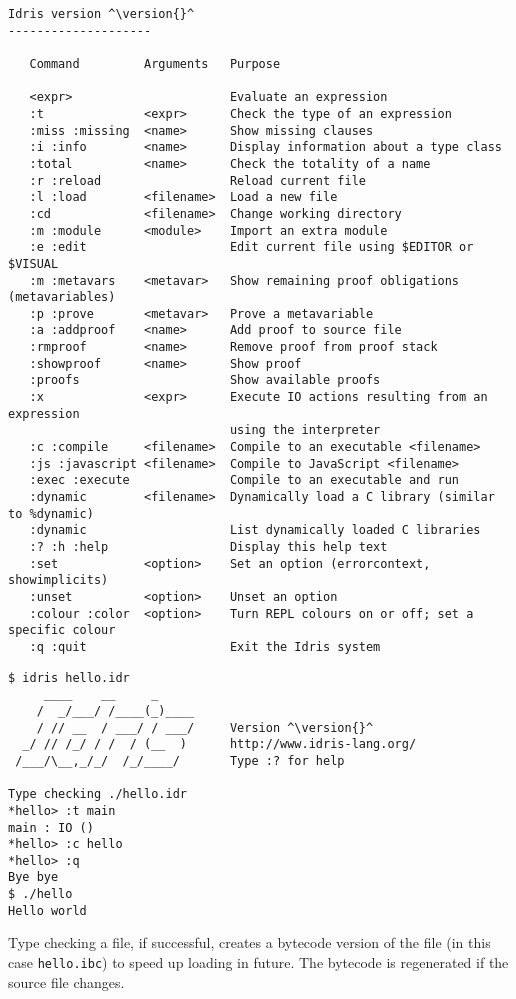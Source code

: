\begin{lstlisting}[caption={Interactive environment commands}, label=cmds, escapechar=^]
Idris version ^\version{}^
--------------------

   Command         Arguments   Purpose
                               
   <expr>                      Evaluate an expression
   :t              <expr>      Check the type of an expression
   :miss :missing  <name>      Show missing clauses
   :i :info        <name>      Display information about a type class
   :total          <name>      Check the totality of a name
   :r :reload                  Reload current file
   :l :load        <filename>  Load a new file
   :cd             <filename>  Change working directory
   :m :module      <module>    Import an extra module
   :e :edit                    Edit current file using $EDITOR or $VISUAL
   :m :metavars    <metavar>   Show remaining proof obligations (metavariables)
   :p :prove       <metavar>   Prove a metavariable
   :a :addproof    <name>      Add proof to source file
   :rmproof        <name>      Remove proof from proof stack
   :showproof      <name>      Show proof
   :proofs                     Show available proofs
   :x              <expr>      Execute IO actions resulting from an expression 
                               using the interpreter
   :c :compile     <filename>  Compile to an executable <filename>
   :js :javascript <filename>  Compile to JavaScript <filename>
   :exec :execute              Compile to an executable and run
   :dynamic        <filename>  Dynamically load a C library (similar to %dynamic)
   :dynamic                    List dynamically loaded C libraries
   :? :h :help                 Display this help text
   :set            <option>    Set an option (errorcontext, showimplicits)
   :unset          <option>    Unset an option
   :colour :color  <option>    Turn REPL colours on or off; set a specific colour
   :q :quit                    Exit the Idris system
\end{lstlisting}

\begin{lstlisting}[caption={Sample Interactive Run}, escapechar=^]
$ idris hello.idr
     ____    __     _                                          
    /  _/___/ /____(_)____                                     
    / // __  / ___/ / ___/     Version ^\version{}^
  _/ // /_/ / /  / (__  )      http://www.idris-lang.org/      
 /___/\__,_/_/  /_/____/       Type :? for help        

Type checking ./hello.idr
*hello> :t main 
main : IO ()
*hello> :c hello 
*hello> :q 
Bye bye
$ ./hello 
Hello world
\end{lstlisting}

\noindent
Type checking a file, if successful, creates a bytecode version of the file (in
this case \texttt{hello.ibc}) to speed up loading in future. The bytecode is
regenerated if the source file changes.


